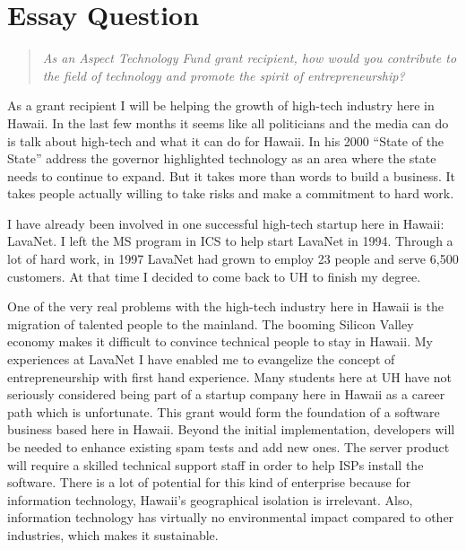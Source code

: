 
\section{Essay Question}

\begin{quote}
  {\em As an Aspect Technology Fund grant recipient, how would you contribute
    to the field of technology and promote the spirit of entrepreneurship?}
\end{quote}

As a grant recipient I will be helping the growth of high-tech industry here in
Hawaii. In the last few months it seems like all politicians and the media can
do is talk about high-tech and what it can do for Hawaii. In his 2000 ``State
of the State'' address the governor highlighted technology as an area where the
state needs to continue to expand. But it takes more than words to build a
business. It takes people actually willing to take risks and make a commitment
to hard work.

I have already been involved in one successful high-tech startup here in
Hawaii: LavaNet. I left the MS program in ICS to help start LavaNet in 1994.
Through a lot of hard work, in 1997 LavaNet had grown to employ 23 people and
serve 6,500 customers. At that time I decided to come back to UH to finish my
degree.

One of the very real problems with the high-tech industry here in Hawaii is the
migration of talented people to the mainland. The booming Silicon Valley
economy makes it difficult to convince technical people to stay in Hawaii. My
experiences at LavaNet I have enabled me to evangelize the concept of
entrepreneurship with first hand experience. Many students here at UH have not
seriously considered being part of a startup company here in Hawaii as a career
path which is unfortunate. This grant would form the foundation of a software
business based here in Hawaii.  Beyond the initial implementation, developers
will be needed to enhance existing spam tests and add new ones. The server
product will require a skilled technical support staff in order to help ISPs
install the software. There is a lot of potential for this kind of enterprise
because for information technology, Hawaii's geographical isolation is
irrelevant. Also, information technology has virtually no environmental impact
compared to other industries, which makes it sustainable.

